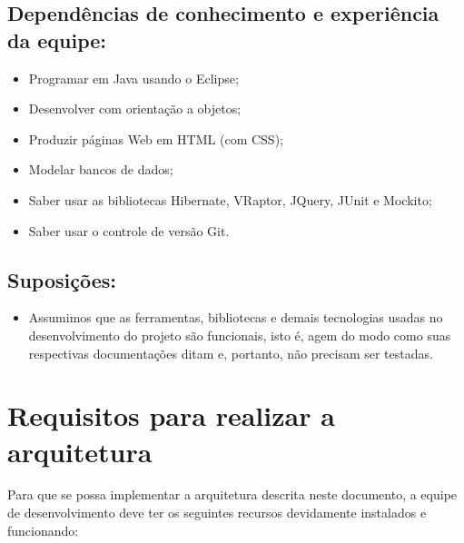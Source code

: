 \documentclass[11pt, a4paper]{article}
\begin{document}
        \subsection{Dependências de conhecimento e experiência da equipe:}
            \begin{itemize}
                \item Programar em Java usando o Eclipse;
                
                \item Desenvolver com orientação a objetos;
                
                \item Produzir páginas Web em HTML (com CSS);
                
                \item Modelar bancos de dados;
                
                \item Saber usar as bibliotecas Hibernate, VRaptor, JQuery, 
				JUnit e Mockito;
                
                \item Saber usar o controle de versão Git.
            \end{itemize}

        \subsection{Suposições:}
            \begin{itemize}
                \item Assumimos que as ferramentas, bibliotecas e demais
                tecnologias usadas no desenvolvimento do projeto são funcionais,
                isto é, agem do modo como suas respectivas documentações ditam
                e, portanto, não precisam ser testadas.
            \end{itemize}

    \section{Requisitos para realizar a arquitetura}
        Para que se possa implementar a arquitetura descrita neste documento, a
        equipe de desenvolvimento deve ter os seguintes recursos devidamente
        instalados e funcionando:
\end{document}
